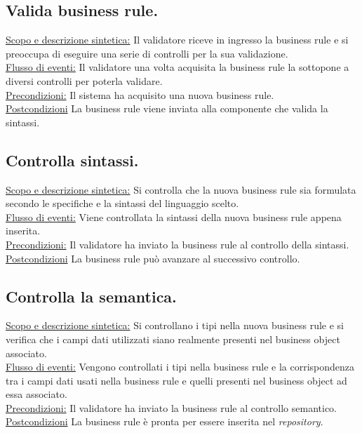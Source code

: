 \subsection{Valida business rule.}
\underline{Scopo e descrizione sintetica:} Il validatore riceve in ingresso la business rule e si preoccupa di eseguire una serie di controlli per la sua validazione.\\
\underline{Flusso di eventi:} Il validatore una volta acquisita la business rule la sottopone a diversi controlli per poterla validare.\\
\underline{Precondizioni:} Il sistema ha acquisito una nuova business rule.\\
\underline{Postcondizioni} La business rule viene inviata alla componente che valida la sintassi.
 
\subsection{Controlla sintassi.}
\underline{Scopo e descrizione sintetica:} Si controlla che la nuova business rule sia formulata secondo le specifiche e la sintassi del linguaggio scelto.\\
\underline{Flusso di eventi:} Viene controllata la sintassi della nuova business rule appena inserita.\\
\underline{Precondizioni:} Il validatore ha inviato la business rule al controllo della sintassi.\\
\underline{Postcondizioni} La business rule pu\`o avanzare al successivo controllo.

\subsection{Controlla la semantica.}
\underline{Scopo e descrizione sintetica:} Si controllano i tipi nella nuova business rule e si verifica che i campi dati utilizzati siano realmente presenti nel business object associato.\\
\underline{Flusso di eventi:} Vengono controllati i tipi nella business rule e la corrispondenza tra i campi dati usati nella business rule e quelli presenti nel business object ad essa associato.\\
\underline{Precondizioni:} Il validatore ha inviato la business rule al controllo semantico.\\
\underline{Postcondizioni} La business rule \`e pronta per essere inserita nel \textit{repository}.


